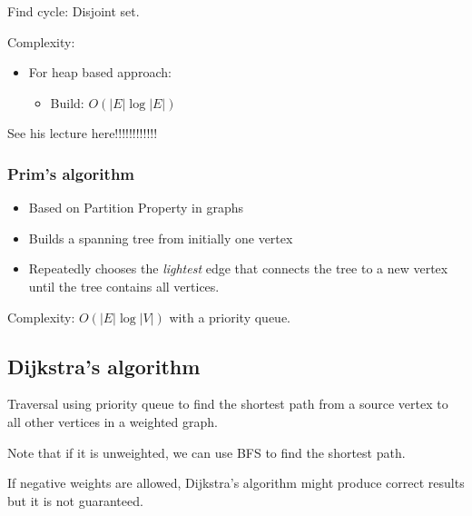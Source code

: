 \documentclass[letterpaper,12pt]{article}
\begin{document}
Find cycle: Disjoint set.

Complexity: \begin{itemize}
    \item For heap based approach: \begin{itemize}
        \item Build: $O(|E|\log |E|)$
    \end{itemize}
\end{itemize}
See his lecture here!!!!!!!!!!!!
\subsubsection{Prim's algorithm}
\begin{itemize}
    \item Based on Partition Property in graphs
    \item Builds a spanning tree from initially one vertex
    \item Repeatedly chooses the \textit{lightest} edge that connects the tree to a new vertex until the tree contains all vertices.
\end{itemize}
\begin{algorithmic}
    \EndWhile
\end{algorithmic}
Complexity: $O(|E|\log |V|)$ with a priority queue.
\subsection{Dijkstra's algorithm}
Traversal using priority queue to find the shortest path from a source vertex to all other vertices in a weighted graph.

Note that if it is unweighted, we can use BFS to find the shortest path.

If negative weights are allowed, Dijkstra's algorithm might produce correct results but it is not guaranteed. 
\end{document}
